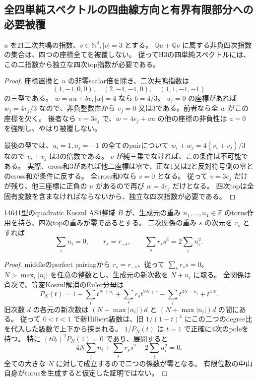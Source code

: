 \subsection{全四単純スペクトルの四曲線方向と有界有限部分への必要被覆}
\label{subsec:cubic-four-simple-spectral-curve-atlas}
\begin{lemma}[二次・三次の指数平面では四次非退化性を満たさない]
\label{lem:cubic-four-simple-extra-quartic}
$u$ を21二次共鳴の指数、$v\in\mathbb N^4,|v|=3$ とする。
$\mathbb Q u+\mathbb Q v$ に属する非負四次指数の集合は、四つの座標全てを被覆しない。
従ってH3の四単純スペクトルには、この二指数から独立な四次top指数が必要である。
\end{lemma}
\begin{proof}
座標置換と $u$ の非零scalar倍を除き、二次共鳴指数は
\[
 (1,-1,0,0),\quad (2,-1,-1,0),\quad (1,1,-1,-1)
\]
の三型である。
$w=au+bv,|w|=4$ なら $b=4/3$。
$u_j=0$ の座標があれば $w_j=4v_j/3$ なので、非負整数性から
$v_j=0$ 又は3である。前者なら全 $w$ がこの座標を欠く。
後者なら $v=3e_j$ で、$w=4e_j+au$ の他の座標の非負性は $a=0$ を強制し、やはり被覆しない。

最後の型では、$u_i=1,u_j=-1$ の全てのpairについて
$w_i+w_j=4(v_i+v_j)/3$ なので $v_i+v_j$ は3の倍数である。
$v$ が純三乗でなければ、この条件は不可能である。
実際、cross和3があれば他二座標は零で、正な1又は2と反対符号側の零とのcross和が条件に反する。
全cross和0なら $v=0$ となる。
従って $v=3e_j$ だけが残り、他三座標に正負の $u$ があるので再び $w=4e_j$ だけとなる。
四次topは全固有変数を含まなければならないから、独立な四次指数が必要である。
\end{proof}

\begin{lemma}[top重み零の一次元torusの二つのmoment条件]
\label{lem:cubic-torus-regrading-moments}
14641型のquadratic Koszul AS4整域 $B$ が、生成元の重み
$n_1,\ldots,n_4\in\mathbb Z$ のtorus作用を持ち、四次topの重みが零であるとする。
二次関係の重み $s$ の次元を $r_s$ とすれば
\[
 \sum_i n_i=0,\qquad r_s=r_{-s},\qquad
 \sum_s r_s s^2=2\sum_i n_i^2.
\]
\end{lemma}
\begin{proof}
middleのperfect pairingから $r_s=r_{-s}$、従って $\sum_s r_s s=0$。
$N>\max_i|n_i|$ を任意の整数とし、生成元の新次数を $N+n_i$ に取る。
全関係は斉次で、等変Koszul解消のEuler分母は
\[
 P_N(t)=1-\sum_i t^{N+n_i}+\sum_s r_st^{2N+s}
          -\sum_i t^{3N-n_i}+t^{4N}.
\]
旧次数 $d$ の各元の新次数は $(N-\max|n_i|)d$ と $(N+\max|n_i|)d$ の間にある。
従って $0<t<1$ で新Hilbert級数は、旧 $1/(1-t)^4$ にこの二つのdegree比を代入した級数で上下から挟まれる。
$1/P_N(t)$ は $t=1$ で正確に4次のpoleを持つ。
特に $(t\partial_t)^2P_N(1)=0$ であり、展開すると
\[
 4N\sum_i n_i+\sum_s r_s s^2-2\sum_i n_i^2=0.
\]
全ての大きな $N$ に対して成立するので二つの係数が零となる。
有限位数の中山自身がtorusを生成すると仮定した証明ではない。
\end{proof}

